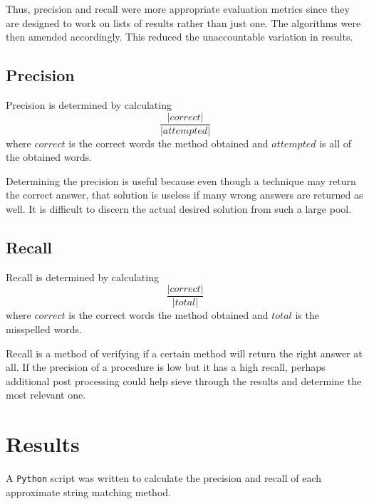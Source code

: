 \documentclass[11pt]{article}
\begin{document}
Thus, precision and recall were more appropriate evaluation metrics since they are designed to work on lists of results rather than just one. The algorithms were then amended accordingly. This reduced the unaccountable variation in results. %


\subsection{Precision}
Precision is determined by calculating 
\begin{equation}\frac{|correct|}{|attempted|}\end{equation}
where \(correct\) is the correct words the method obtained and \(attempted\) is all of the obtained words. 

Determining the precision is useful because even though a technique may return the correct answer, that solution is useless if many wrong answers are returned as well. It is difficult to discern the actual desired solution from such a large pool.

\subsection{Recall}
Recall is determined by calculating 
\begin{equation}\frac{|correct|}{|total|}\end{equation}
where \(correct\) is the correct words the method obtained and \(total\) is the misspelled words. 

Recall is a method of verifying if a certain method will return the right answer at all. If the precision of a procedure is low but it has a high recall, perhaps additional post processing could help sieve through the results and determine the most relevant one.


\section{Results}

A \texttt{Python} script was written to calculate the precision and recall of each approximate string matching method.
\end{document}
